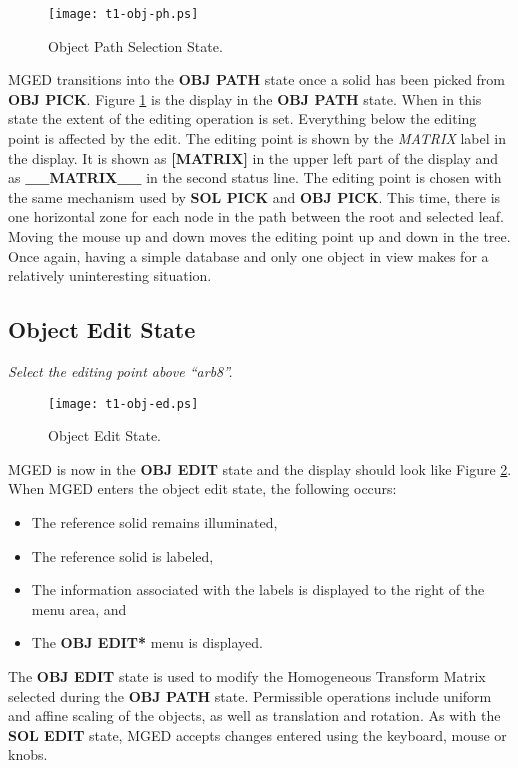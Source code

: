 \begin{figure}
\centering \texttt{[image: t1-obj-ph.ps]}
\caption{Object Path Selection State.}
\label{t1-obj-ph}
\end{figure}

MGED transitions into the {\bf OBJ PATH} state once a solid has been
picked from {\bf OBJ PICK}. Figure \ref{t1-obj-ph} is the display in
the {\bf OBJ PATH} state.  When in this state the extent of the editing
operation is set.  Everything below the editing point is affected by the
edit.  The editing point is shown by the {\sl MATRIX} label in the
display.  It is shown as {\bf [MATRIX]} in the upper left part of the
display and as {\bf \_\_MATRIX\_\_} in the second status line.  The editing
point is chosen with the same mechanism used by {\bf SOL PICK} and
{\bf OBJ PICK}.  This time, there is one horizontal zone for each node in
the path between the root and selected leaf.  Moving the mouse up and down
moves the editing point up and down in the tree.  Once again, having a
simple database and only one object in view makes for a relatively
uninteresting situation.

\subsection{Object Edit State}

\noindent
{\em Select the editing point above ``arb8''.}\\

\begin{figure}
\centering \texttt{[image: t1-obj-ed.ps]}
\caption{Object Edit State.}
\label{t1-obj-ed}
\end{figure}

MGED is now in the {\bf OBJ EDIT} state and the display should look like
Figure \ref{t1-obj-ed}.
When MGED enters the object edit state, the following occurs:
\begin{itemize}
\item The reference solid remains illuminated,
\item The reference solid is labeled,
\item The information associated with the labels is displayed to the right
of the menu area, and
\item The {\bf *OBJ EDIT*} menu is displayed.
\end{itemize}

The {\bf OBJ EDIT} state is used to modify the
Homogeneous Transform Matrix selected during the {\bf OBJ PATH} state.
Permissible operations include uniform and affine scaling of the objects,
as well as translation and rotation.
As with the {\bf SOL EDIT} state, MGED accepts changes entered using
the keyboard, mouse or knobs.

